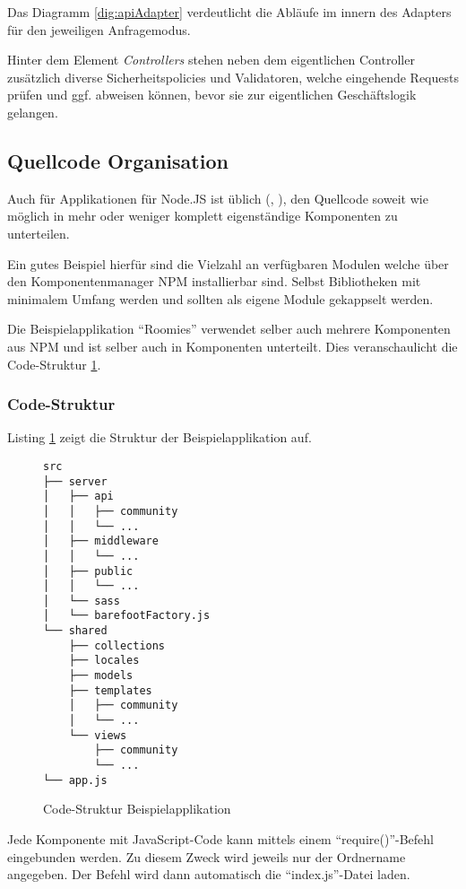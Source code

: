 Das Diagramm \ref{dig:apiAdapter} verdeutlicht die Abläufe im innern des Adapters für den jeweiligen Anfragemodus.

Hinter dem Element \emph{Controllers} stehen neben dem eigentlichen Controller zusätzlich diverse Sicherheitspolicies und Validatoren, welche eingehende Requests prüfen und ggf. abweisen können, bevor sie zur eigentlichen Geschäftslogik gelangen.




\subsection{Quellcode Organisation}
Auch für Applikationen für Node.JS ist üblich (\cite{TJH_ComponentStructure}, \cite{IZS_ComponentStructure}), den Quellcode soweit wie möglich in mehr oder weniger komplett eigenständige Komponenten zu unterteilen.

Ein gutes Beispiel hierfür sind die Vielzahl an verfügbaren Modulen welche über den Komponentenmanager NPM \cite{NPM} installierbar sind. Selbst Bibliotheken mit minimalem Umfang werden und sollten als eigene Module gekappselt werden.

Die Beispielapplikation ``Roomies'' verwendet selber auch mehrere Komponenten aus NPM \cite{NPM} und ist selber auch in
Komponenten unterteilt. Dies veranschaulicht die Code-Struktur \ref{verb:roomiesCodeStruktur}.

\newpage
\subsubsection*{Code-Struktur}

Listing \ref{verb:roomiesCodeStruktur} zeigt die Struktur der Beispielapplikation auf.

\begin{figure}[ht!]
	\begin{verbatim}
src
├── server
│   ├── api
│   │   ├── community
│   │   └── ...
│   ├── middleware
│   │   └── ...
│   ├── public
│   │   └── ...
│   └── sass
│   └── barefootFactory.js
└── shared
    ├── collections
    ├── locales
    ├── models
    ├── templates
    │   ├── community
    │   └── ...
    └── views
        ├── community
        └── ...
└── app.js
	\end{verbatim}
	\caption{Code-Struktur Beispielapplikation}
	\label{verb:roomiesCodeStruktur}
\end{figure}

Jede Komponente mit JavaScript-Code kann mittels einem ``require()''-Befehl eingebunden werden. Zu diesem Zweck wird jeweils nur der Ordnername angegeben. Der Befehl wird dann automatisch die ``index.js''-Datei laden.


